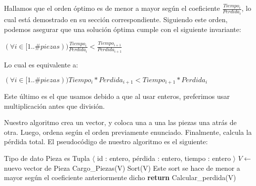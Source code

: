 Hallamos que el orden óptimo es de menor a mayor según el coeficiente $\frac{Tiempo_i}{Perdida_i}$, lo cual está demostrado en su sección correspondiente. Siguiendo este orden, podemos asegurar que una solución óptima cumple con el siguiente invariante:

\begin{center}

$(\forall i \in [1..\#{piezas})) \frac{Tiempo_i}{Perdida_i} < \frac{Tiempo_{i+1}}{Perdida_{i+1}}$
 
\end{center}

Lo cual es equivalente a:

\begin{center}

$(\forall i \in [1..\#{piezas})) Tiempo_i * Perdida_{i+1} < Tiempo_{i+1} * Perdida_i$
 
\end{center}

Este último es el que usamos debido a que al usar enteros, preferimos usar multiplicación antes que división.

Nuestro algoritmo crea un vector, y coloca una a una las piezas una atrás de otra. Luego, ordena según el orden previamente enunciado. Finalmente, calcula la pérdida total. El pseudocódigo de nuestro algoritmo es el siguiente:

\renewcommand{\algorithmiccomment}[1]{\hskip2em$//$ #1}

\begin{pseudo}
\State Tipo de dato Pieza es Tupla $\langle$ id : entero, pérdida : entero, tiempo : entero $\rangle$
        \State $V \leftarrow$ nuevo vector de Pieza %
        \State Cargo\_Piezas(V) %
        \State Sort(V) %
        \Comment Este sort se hace de menor a mayor según el coeficiente anteriormente dicho
        \State \textbf{return} Calcular\_perdida(V) %
    \EndProcedure
\end{pseudo}